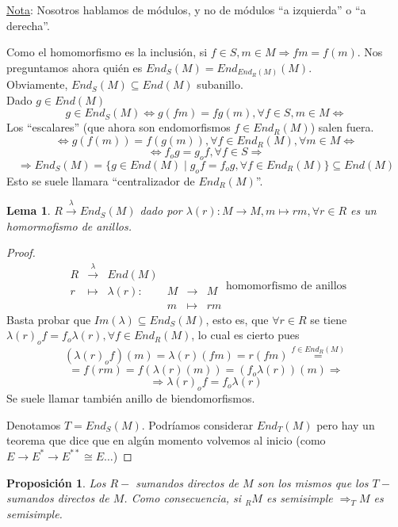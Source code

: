 \documentclass[11pt,a4paper]{article}
\theoremstyle{break}
\newtheorem{lemma}[theorem]{Lema}
\newtheorem{proposition}[theorem]{Proposición}
\begin{document}
\underline{Nota}: Nosotros hablamos de módulos, y no de módulos ``a izquierda'' o ``a derecha''.

Como el homomorfismo es la inclusión, si $f \in S, m \in M \Rightarrow fm = f(m)$. Nos preguntamos ahora quién es $End_{S}(M) = End_{End_{R}(M)}(M)$. \\
Obviamente, $End_{S}(M) \subseteq End(M)$ subanillo. \\
Dado $g \in End(M)$
$$g \in End_{S}(M) \iff g(fm) = fg(m), \forall f \in S, m \in M \iff$$
Los ``escalares'' (que ahora son endomorfismos $f \in End_{R}(M)$) salen fuera.
$$\iff g(f(m)) = f(g(m)), \forall f \in End_{R}(M), \forall m \in M \iff$$
$$\iff f_{o}g = g_{o}f, \forall f \in S \Rightarrow$$
$$\Rightarrow End_{S}(M) = \{g \in End(M) \mid g_{o}f = f_{o}g, \forall f \in End_{R}(M)\} \subseteq End(M)$$
Esto se suele llamara ``centralizador de $End_{R}(M)$''.

\begin{lemma}
$R \overset{\lambda}{\to} End_{S}(M)$ dado por $\lambda(r): M \to M, m \mapsto rm, \forall r \in R$ es un homormofismo de anillos.
\end{lemma}

\begin{proof}
$$\begin{aligned}
R & \overset{\lambda}{\to} & End(M) & & \\
r & \mapsto & \lambda(r): & M & \to & M \\
 & & & m & \mapsto & rm
\end{aligned} \text{homomorfismo de anillos}$$
Basta probar que $Im(\lambda) \subseteq End_{S}(M)$, esto es, que $\forall r \in R$ se tiene $\lambda(r)_{o}f = f_{o}\lambda(r), \forall f \in End_{R}(M)$, lo cual es cierto pues
$$(\lambda(r)_{o}f)(m) = \lambda(r)(fm) = r(fm) \overset{f \in End_{R}(M)}{=}$$
$$= f(rm) = f(\lambda(r)(m)) = (f_{o}\lambda(r))(m) \Rightarrow$$
$$\Rightarrow \lambda(r)_{o}f = f_{o}\lambda(r)$$
Se suele llamar también anillo de biendomorfismos.

Denotamos $T = End_{S}(M)$. Podríamos considerar $End_{T}(M)$ pero hay un teorema que dice que en algún momento volvemos al inicio (como $E \to E^{*} \to E^{**} \cong E \dots$)
\end{proof}

\begin{proposition}
Los $R-$ sumandos directos de $M$ son los mismos que los $T-$sumandos directos de $M$. Como consecuencia, si $_{R}M$ es semisimple $\Rightarrow _{T}M$ es semisimple.
\end{proposition}
\end{document}
